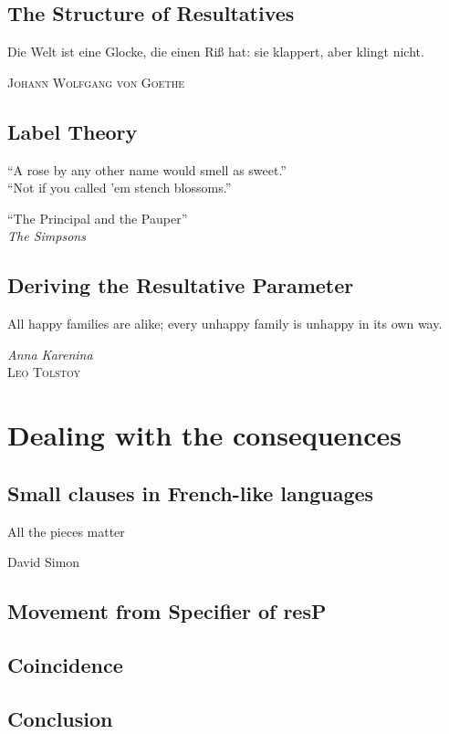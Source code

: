 \documentclass[
	12pt,
	twoside,
	narrowmargins
	]{ut-thesis}
\theoremstyle{definition}
\begin{document}
\chapter{The Structure of Resultatives}\label{sec:analysis}
\epigraph{Die Welt ist eine Glocke, die einen Ri\ss{} hat: sie klappert, aber klingt nicht.}{\textsc{Johann Wolfgang von Goethe}}

\chapter{Label Theory}\label{sec:labels}
\epigraph{``A rose by any other name would smell as sweet.''\\
``Not if you called 'em stench blossoms.''}{``The Principal and the Pauper''\\\textit{The Simpsons}}

%
\chapter{Deriving the Resultative Parameter}\label{sec:deriving}
\epigraph{All happy families are alike; every unhappy family is unhappy in its own way.}{\textit{Anna Karenina}\\\textsc{Leo Tolstoy}}


\part{Dealing with the consequences}\label{sec:part2}
\chapter{Small clauses in French-like languages}\label{sec:FreSC}
\epigraph{All the pieces matter}{David Simon}

\chapter{Movement from Specifier of resP}\label{sec:ACCing}

\chapter{Coincidence}\label{sec:coincidence}

\chapter{Conclusion}\label{sec:Conclusion}

\printbibliography[heading=bibintoc]
\end{document}
